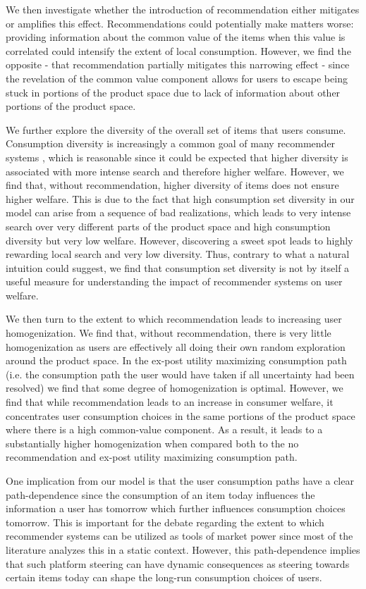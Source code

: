 \documentclass[format=acmsmall, review=false]{acmart}
\newcommand{\xhdr}[1]{\vspace{1mm} \noindent{\bf #1}}
\begin{document}
We then investigate whether the introduction of recommendation either mitigates or amplifies this effect. Recommendations could potentially make matters worse: providing information about the common value of the items when this value is correlated could intensify the extent of local consumption. However, we find the opposite - that recommendation partially mitigates this narrowing effect - since the revelation of the common value component allows for users to escape being stuck in portions of the product space due to lack of information about other portions of the product space.
\par
\xhdr{Additional Findings} We further explore the diversity of the overall set of items that users consume. Consumption diversity is increasingly a common goal of many recommender systems \cite{castells2015novelty, kunaver2017diversity}, which is reasonable since it could be expected that higher diversity is associated with more intense search and therefore higher welfare. However, we find that, without recommendation, higher diversity of items does not ensure higher welfare. This is due to the fact that high consumption set diversity in our model can arise from a sequence of bad realizations, which leads to very intense search over very different parts of the product space and high consumption diversity but very low welfare. However, discovering a sweet spot leads to highly rewarding local search and very low diversity. Thus, contrary to what a natural intuition could suggest, we find that consumption set diversity is not by itself a useful measure for understanding the impact of recommender systems on user welfare.
\par
We then turn to the extent to which recommendation leads to increasing user homogenization. We find that, without recommendation, there is very little homogenization as users are effectively all doing their own random exploration around the product space. In the ex-post utility maximizing consumption path (i.e. the consumption path the user would have taken if all uncertainty had been resolved) we find that some degree of homogenization is optimal. However, we find that while recommendation leads to an increase in consumer welfare, it concentrates user consumption choices in the same portions of the product space where there is a high common-value component. As a result, it leads to a substantially higher homogenization when compared both to the no recommendation and ex-post utility maximizing consumption path.
\par 
One implication from our model is that the user consumption paths have a clear path-dependence since the consumption of an item today influences the information a user has tomorrow which further influences consumption choices tomorrow. This is important for the debate regarding the extent to which recommender systems can be utilized as tools of market power since most of the literature analyzes this in a static context. However, this path-dependence implies that such platform steering can have dynamic consequences as steering towards certain items today can shape the long-run consumption choices of users. 
\end{document}
